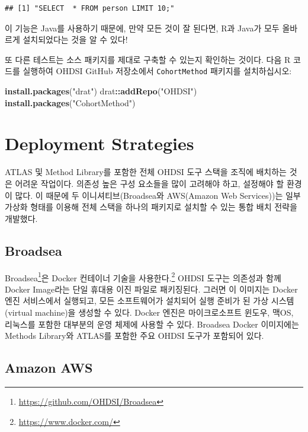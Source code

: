 \documentclass[11pt]{book}
\newenvironment{Shaded}{\begin{snugshade}}{\end{snugshade}}
\newcommand{\KeywordTok}[1]{\textcolor[rgb]{0.13,0.29,0.53}{\textbf{#1}}}
\newcommand{\StringTok}[1]{\textcolor[rgb]{0.31,0.60,0.02}{#1}}
\newcommand{\OperatorTok}[1]{\textcolor[rgb]{0.81,0.36,0.00}{\textbf{#1}}}
\newcommand{\NormalTok}[1]{#1}
\let\rmarkdownfootnote\footnote%
\def\footnote{\protect\rmarkdownfootnote}
\theoremstyle{definition}
\theoremstyle{definition}
\theoremstyle{definition}
\theoremstyle{remark}
\begin{document}
\begin{verbatim}
## [1] "SELECT  * FROM person LIMIT 10;"
\end{verbatim}

이 기능은 Java를 사용하기 때문에, 만약 모든 것이 잘 된다면, R과 Java가
모두 올바르게 설치되었다는 것을 알 수 있다!

또 다른 테스트는 소스 패키지를 제대로 구축할 수 있는지 확인하는 것이다.
다음 R 코드를 실행하여 OHDSI GitHub 저장소에서 \texttt{CohortMethod}
패키지를 설치하십시오:

\begin{Shaded}
\begin{Highlighting}[]
\KeywordTok{install.packages}\NormalTok{(}\StringTok{"drat"}\NormalTok{)}
\NormalTok{drat}\OperatorTok{::}\KeywordTok{addRepo}\NormalTok{(}\StringTok{"OHDSI"}\NormalTok{)}
\KeywordTok{install.packages}\NormalTok{(}\StringTok{"CohortMethod"}\NormalTok{)}
\end{Highlighting}
\end{Shaded}

\section{Deployment Strategies}\label{deployment-strategies}

ATLAS 및 Method Library를 포함한 전체 OHDSI 도구 스택을 조직에 배치하는
것은 어려운 작업이다. 의존성 높은 구성 요소들을 많이 고려해야 하고,
설정해야 할 환경이 많다. 이 때문에 두 이니셔티브(Broadsea와 AWS(Amazon
Web Services))는 일부 가상화 형태를 이용해 전체 스택을 하나의 패키지로
설치할 수 있는 통합 배치 전략을 개발했다. 

\subsection{Broadsea}\label{broadsea}

Broadsea\footnote{\url{https://github.com/OHDSI/Broadsea}}은 Docker
컨테이너 기술을 사용한다.\footnote{\url{https://www.docker.com/}} OHDSI
도구는 의존성과 함께 Docker Image라는 단일 휴대용 이진 파일로
패키징된다. 그러면 이 이미지는 Docker 엔진 서비스에서 실행되고, 모든
소프트웨어가 설치되어 실행 준비가 된 가상 시스템(virtual machine)을
생성할 수 있다. Docker 엔진은 마이크로소프트 윈도우, 맥OS, 리눅스를
포함한 대부분의 운영 체제에 사용할 수 있다. Broadsea Docker 이미지에는
Methods Library와 ATLAS를 포함한 주요 OHDSI 도구가 포함되어 있다.

\subsection{Amazon AWS}\label{amazon-aws}
\end{document}
